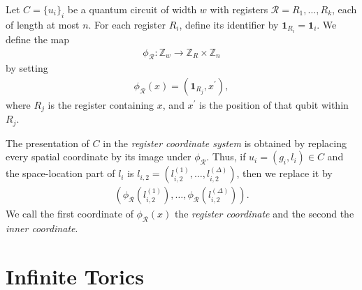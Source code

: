 \begin{definition}
  Let $C=\{u_i\}_i$ be a quantum circuit of width $w$ with registers $\mathcal{R}=R_{1},\ldots,R_{k}$, each of length at most $n$. For each register $R_i$, define its identifier by $\mathbf{1}_{R_i}=\mathbf{1}_i$. We define the map
  \begin{equation*}
    \begin{split}
      \phi_{\mathcal{R}} \colon \mathbb{Z}_{w} \to \mathbb{Z}_{R}\times \mathbb{Z}_{n}
    \end{split}
  \end{equation*}
  by setting
  \begin{equation*}
    \begin{split}
      \phi_{\mathcal{R}}(x)=(\mathbf{1}_{R_j},x^{\prime}),
    \end{split}
  \end{equation*}
  where $R_j$ is the register containing $x$, and $x^{\prime}$ is the position of that qubit within $R_j$.

  The presentation of $C$ in the \textit{register coordinate system} is obtained by replacing every spatial coordinate by its image under $\phi_{\mathcal{R}}$. Thus, if $u_i=(g_i,l_i)\in C$ and the space-location part of $l_i$ is $l_{i,2}=(l_{i,2}^{(1)},\ldots,l_{i,2}^{(\Delta)})$, then we replace it by
  \begin{equation*}
    \begin{split}
      (\phi_{\mathcal{R}}(l_{i,2}^{(1)}),\ldots,\phi_{\mathcal{R}}(l_{i,2}^{(\Delta)})).
    \end{split}
  \end{equation*}
  We call the first coordinate of $\phi_{\mathcal{R}}(x)$ the \textit{register coordinate} and the second the \textit{inner coordinate}.
\end{definition}
\section{Infinite Torics}

